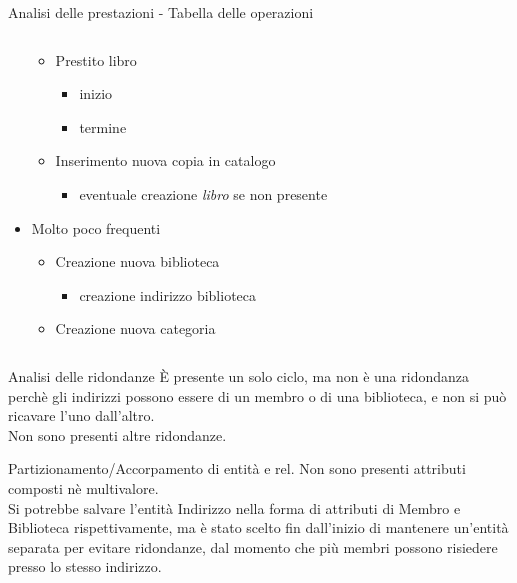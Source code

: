 \begin{frame}{Analisi delle prestazioni - Tabella delle operazioni}
\begin{columns}[c]
\begin{column}[T]{.45\textwidth}
\begin{itemize}
                    \begin{itemize}
                        \item Prestito libro
                            \begin{itemize}
                                \item inizio
                                \item termine
                            \end{itemize}
                        \item Inserimento nuova copia in catalogo
                            \begin{itemize}
                                \item eventuale creazione \textit{libro} se non presente
                            \end{itemize}
                    \end{itemize}
                \item Molto poco frequenti
                    \begin{itemize}
                        \item Creazione nuova biblioteca
                            \begin{itemize}
                                \item creazione indirizzo biblioteca
                            \end{itemize}
                        \item Creazione nuova categoria
                    \end{itemize}
            \end{itemize}
        \end{column}
    \end{columns}
\end{frame}

\begin{frame}{Analisi delle ridondanze}
    È presente un solo ciclo, ma non è una ridondanza perchè gli indirizzi possono essere di un membro o di una biblioteca, e non si può ricavare l'uno dall'altro.\\

    Non sono presenti altre ridondanze.
\end{frame}

\begin{frame}{Partizionamento/Accorpamento di entità e rel.}
    Non sono presenti attributi composti nè multivalore.\\

    Si potrebbe salvare l'entità Indirizzo nella forma di attributi di Membro e Biblioteca rispettivamente, ma è stato scelto fin dall'inizio di mantenere un'entità separata per evitare ridondanze, dal momento che più membri possono risiedere presso lo stesso indirizzo. 
\end{frame}

